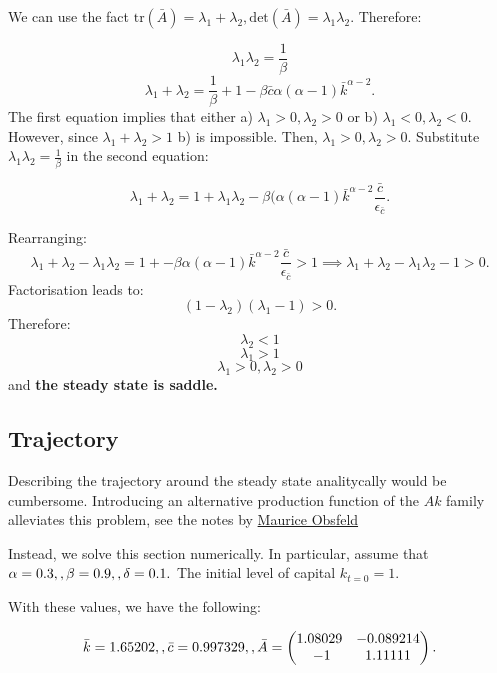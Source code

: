 \documentclass[11pt,a4paper,english]{article}
\begin{document}
We can use the fact
\(\mathrm{tr}(\bar{A}) = \lambda_{1} + \lambda_{2}, \mathrm{det}(\bar{A}) = \lambda_{1} \lambda_{2}.\)
Therefore:

\[\lambda_{1} \lambda_{2} = \frac{1}{\beta} \]
\[\lambda_{1} + \lambda_{2} = \frac{1}{\beta} + 1 - \beta \bar{c} \alpha (\alpha-1) \bar{k}^{\alpha -2}.\]
The first equation implies that either a)
\(\lambda_{1} > 0, \lambda_{2} > 0\) or b)
\(\lambda_{1} < 0, \lambda_{2} < 0.\) However, since
\(\lambda_{1} + \lambda_{2} > 1\) b) is impossible. Then,
\(\lambda_{1} > 0, \lambda_{2} > 0.\) Substitute \(\lambda_1 \lambda_2 = \frac{1}{\beta} \) in the second equation:

\[ \lambda_{1} + \lambda_{2} = 1+ \lambda_{1} \lambda_{2} - \beta ( \alpha (\alpha - 1) \bar{k}^{\alpha -2}\frac{\bar{c}}{\epsilon_{\bar{c}}}.\]

Rearranging:
\[ \lambda_{1} + \lambda_{2} - \lambda_{1} \lambda_{2} =  1+  - \beta \alpha (\alpha -1) \bar{k}^{\alpha -2}\frac{\bar{c}}{\epsilon_{\bar{c}}} > 1 \implies \lambda_{1} + \lambda_{2} - \lambda_{1}\lambda_{2} - 1 >0.\]
Factorisation leads to: \[(1 - \lambda_{2})(\lambda_{1} - 1) > 0.\]
Therefore: \[ \lambda_{2} < 1 \] \[ \lambda_{1} > 1 \]
\[ \lambda_{1} > 0, \lambda_{2} > 0\] and \textbf{the steady state is
saddle.}

\hypertarget{trajectory}{%
\subsection{Trajectory}\label{trajectory}}

Describing the trajectory around the steady state analitycally would be
cumbersome. Introducing an alternative production function of the \(Ak\)
family alleviates this problem, see the notes by
\href{https://eml.berkeley.edu/~webfac/obstfeld/e202a_f13/lecture2.pdf}{Maurice
Obsfeld}

Instead, we solve this section numerically. In particular, assume that
\(\alpha = 0.3, \\, \beta = 0.9, \\, \delta = 0.1.\) The initial level
of capital \(k_{t=0} = 1.\)

With these values, we have the following:

\[\bar{k} = 1.65202, \\, \bar{c}=0.997329, \\, \bar{A} = \begin{pmatrix} 1.08029 & -0.089214 \\\ -1 & 1.11111 \end{pmatrix}.\]
\end{document}
